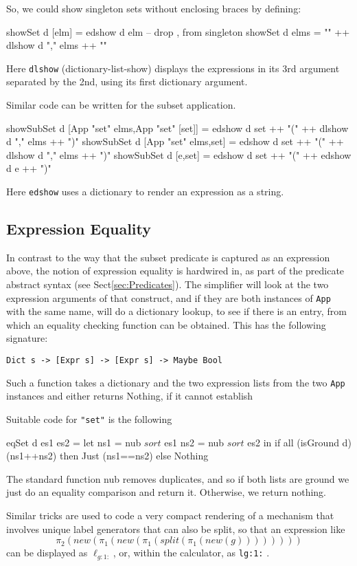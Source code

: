 So, we could show singleton sets without enclosing braces
by defining:
\begin{code}
showSet d [elm] = edshow d elm   -- drop {,} from singleton
showSet d elms = "{" ++ dlshow d "," elms ++ "}"
\end{code}
Here \texttt{dlshow} (dictionary-list-show) displays the expressions
in its 3rd argument separated by the 2nd,
using its first dictionary argument.

Similar code can be written for the subset application.
\begin{code}
showSubSet d [App "set" elms,App "set" [set]]
 = edshow d set ++ "(" ++ dlshow d "," elms ++ ")"
showSubSet d [App "set" elms,set]
 = edshow d set ++ "(" ++ dlshow d "," elms ++ ")"
showSubSet d [e,set]
 = edshow d set ++ "(" ++ edshow d e ++ ")"
\end{code}
Here \texttt{edshow} uses a dictionary to render an expression as a string.

\subsection{Expression Equality}

In contrast to the way that the subset predicate
is captured as an expression above,
the notion of expression equality is hardwired in,
as part of the predicate abstract syntax (see Sect\ref{sec:Predicates}).
The simplifier will look at the two expression
arguments of that construct,
and if they are both instances of \texttt{App} with the same name,
will do a dictionary lookup, to see if there
is an entry, from
which an equality checking function can be obtained.
This has the following signature:
\begin{verbatim}
Dict s -> [Expr s] -> [Expr s] -> Maybe Bool
\end{verbatim}
Such a function takes a dictionary and the two expression
lists from the two \texttt{App} instances
and either returns Nothing, if it cannot establish

Suitable code for \verb$"set"$ is the following
\begin{code}
eqSet d es1 es2
 = let ns1 = nub $ sort $ es1
       ns2 = nub $ sort $ es2
   in if all (isGround d) (ns1++ns2)
      then Just (ns1==ns2)
      else Nothing
\end{code}
The standard function nub removes duplicates,
and so if both lists are ground we just do an equality comparison
and return it. Otherwise, we return nothing.


Similar tricks are used to code a very compact rendering
of a mechanism that involves unique label generators
that can also be split, so that an expression like
\[
 \pi_2(new(\pi_1(new(\pi_1(split(\pi_1(new(g))))))))
\]
can be displayed as $\ell_{g:1:}$, or,
within the calculator, as \texttt{lg:1:} .


